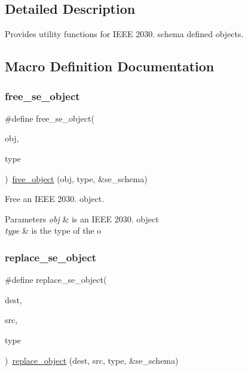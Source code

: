 \subsection{Detailed Description}
Provides utility functions for I\+E\+EE 2030. schema defined objects. 

\subsection{Macro Definition Documentation}
\mbox{\label{group__se__object_gab24b84e0b8b364115f5b5af19a9860a2}} 
\subsubsection{\texorpdfstring{free\+\_\+se\+\_\+object}{free\_se\_object}}
{\footnotesize\ttfamily \#define free\+\_\+se\+\_\+object(\begin{DoxyParamCaption}\item[{}]{obj,  }\item[{}]{type }\end{DoxyParamCaption})~\hyperlink{group__schema_gaff2eea92a7727eb0f66bfa00ab05b080}{free\+\_\+object} (obj, type, \&se\+\_\+schema)}



Free an I\+E\+EE 2030. object. 


\begin{DoxyParams}{Parameters}
{\em obj} & is an I\+E\+EE 2030. object \\
\hline
{\em type} & is the type of the o \\
\hline
\end{DoxyParams}
\mbox{\label{group__se__object_ga31d6d3800c0c415a852faaa5f41b3afe}} 
\subsubsection{\texorpdfstring{replace\+\_\+se\+\_\+object}{replace\_se\_object}}
{\footnotesize\ttfamily \#define replace\+\_\+se\+\_\+object(\begin{DoxyParamCaption}\item[{}]{dest,  }\item[{}]{src,  }\item[{}]{type }\end{DoxyParamCaption})~\hyperlink{group__schema_gadec1b0417cb8f2c7ee7075d5be5e09c1}{replace\+\_\+object} (dest, src, type, \&se\+\_\+schema)}



